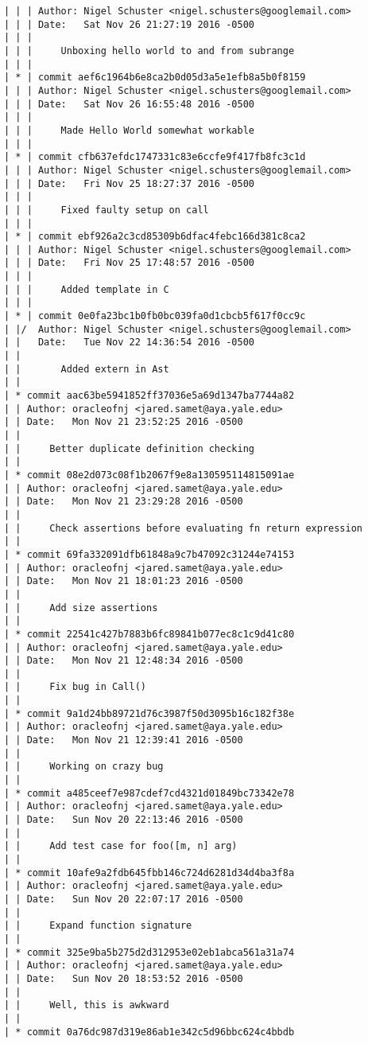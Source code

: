 \begin{lstlisting}
| | | Author: Nigel Schuster <nigel.schusters@googlemail.com>
| | | Date:   Sat Nov 26 21:27:19 2016 -0500
| | | 
| | |     Unboxing hello world to and from subrange
| | |    
| * | commit aef6c1964b6e8ca2b0d05d3a5e1efb8a5b0f8159
| | | Author: Nigel Schuster <nigel.schusters@googlemail.com>
| | | Date:   Sat Nov 26 16:55:48 2016 -0500
| | | 
| | |     Made Hello World somewhat workable
| | |    
| * | commit cfb637efdc1747331c83e6ccfe9f417fb8fc3c1d
| | | Author: Nigel Schuster <nigel.schusters@googlemail.com>
| | | Date:   Fri Nov 25 18:27:37 2016 -0500
| | | 
| | |     Fixed faulty setup on call
| | |    
| * | commit ebf926a2c3cd85309b6dfac4febc166d381c8ca2
| | | Author: Nigel Schuster <nigel.schusters@googlemail.com>
| | | Date:   Fri Nov 25 17:48:57 2016 -0500
| | | 
| | |     Added template in C
| | |    
| * | commit 0e0fa23bc1b0fb0bc039fa0d1cbcb5f617f0cc9c
| |/  Author: Nigel Schuster <nigel.schusters@googlemail.com>
| |   Date:   Tue Nov 22 14:36:54 2016 -0500
| |   
| |       Added extern in Ast
| |   
| * commit aac63be5941852ff37036e5a69d1347ba7744a82
| | Author: oracleofnj <jared.samet@aya.yale.edu>
| | Date:   Mon Nov 21 23:52:25 2016 -0500
| | 
| |     Better duplicate definition checking
| |   
| * commit 08e2d073c08f1b2067f9e8a130595114815091ae
| | Author: oracleofnj <jared.samet@aya.yale.edu>
| | Date:   Mon Nov 21 23:29:28 2016 -0500
| | 
| |     Check assertions before evaluating fn return expression
| |   
| * commit 69fa332091dfb61848a9c7b47092c31244e74153
| | Author: oracleofnj <jared.samet@aya.yale.edu>
| | Date:   Mon Nov 21 18:01:23 2016 -0500
| | 
| |     Add size assertions
| |   
| * commit 22541c427b7883b6fc89841b077ec8c1c9d41c80
| | Author: oracleofnj <jared.samet@aya.yale.edu>
| | Date:   Mon Nov 21 12:48:34 2016 -0500
| | 
| |     Fix bug in Call()
| |   
| * commit 9a1d24bb89721d76c3987f50d3095b16c182f38e
| | Author: oracleofnj <jared.samet@aya.yale.edu>
| | Date:   Mon Nov 21 12:39:41 2016 -0500
| | 
| |     Working on crazy bug
| |   
| * commit a485ceef7e987cdef7cd4321d01849bc73342e78
| | Author: oracleofnj <jared.samet@aya.yale.edu>
| | Date:   Sun Nov 20 22:13:46 2016 -0500
| | 
| |     Add test case for foo([m, n] arg)
| |   
| * commit 10afe9a2fdb645fbb146c724d6281d34d4ba3f8a
| | Author: oracleofnj <jared.samet@aya.yale.edu>
| | Date:   Sun Nov 20 22:07:17 2016 -0500
| | 
| |     Expand function signature
| |   
| * commit 325e9ba5b275d2d312953e02eb1abca561a31a74
| | Author: oracleofnj <jared.samet@aya.yale.edu>
| | Date:   Sun Nov 20 18:53:52 2016 -0500
| | 
| |     Well, this is awkward
| |   
| * commit 0a76dc987d319e86ab1e342c5d96bbc624c4bbdb

\end{lstlisting}
